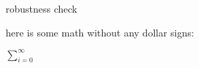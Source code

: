 \documentclass[class=article, crop=false]{standalone}
\begin{document}
\begin{zettel}{robustness check}

    here is some math without any dollar signs:

    $\sum_{i=0}^{\infty}$

\end{zettel}
\end{document}
